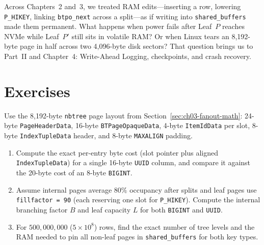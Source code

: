 Across Chapters~2 and~3, we treated RAM edits---inserting a row, lowering \texttt{P\_HIKEY}, linking \texttt{btpo\_next} across a split---as if writing into \texttt{shared\_buffers} made them permanent. What happens when power fails after Leaf~$P$ reaches NVMe while Leaf~$P'$ still sits in volatile RAM? Or when Linux tears an 8,192-byte page in half across two 4,096-byte disk sectors? That question brings us to Part~II and Chapter~4: Write-Ahead Logging, checkpoints, and crash recovery.

\section{Exercises}
\label{sec:ch03-exercises}

\begin{exercise}
\label{exer:ch03-fanout-uuid}
Use the 8,192-byte \texttt{nbtree} page layout from Section~\ref{sec:ch03-fanout-math}: 24-byte \texttt{PageHeaderData}, 16-byte \texttt{BTPageOpaqueData}, 4-byte \texttt{ItemIdData} per slot, 8-byte \texttt{IndexTupleData} header, and 8-byte \texttt{MAXALIGN} padding.
\begin{enumerate}
  \item Compute the exact per-entry byte cost (slot pointer plus aligned \texttt{IndexTupleData}) for a single 16-byte \texttt{UUID} column, and compare it against the 20-byte cost of an 8-byte \texttt{BIGINT}.
  \item Assume internal pages average $80\%$ occupancy after splits and leaf pages use \texttt{fillfactor = 90} (each reserving one slot for \texttt{P\_HIKEY}). Compute the internal branching factor $B$ and leaf capacity $L$ for both \texttt{BIGINT} and \texttt{UUID}.
  \item For $500{,}000{,}000$ ($5 \times 10^8$) rows, find the exact number of tree levels and the RAM needed to pin all non-leaf pages in \texttt{shared\_buffers} for both key types.
\end{enumerate}
\end{exercise}

